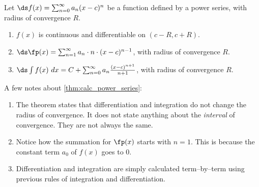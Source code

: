{Let $\ds f(x) = \sum_{n=0}^\infty a_n(x-c)^n$ be a function defined by a power series, with radius of convergence $R$.
\begin{enumerate}
	\item $f(x)$ is continuous and differentiable on $(c-R,c+R)$.
	\item	$\ds \fp(x) = \sum_{n=1}^\infty a_n\cdot n\cdot (x-c)^{n-1}$, with radius of convergence $R$.
	\item	$\ds \int f(x)\ dx = C+\sum_{n=0}^\infty a_n\frac{(x-c)^{n+1}}{n+1}$, with radius of convergence $R$.
\end{enumerate}}

A few notes about \autoref{thm:calc_power_series}:
\begin{enumerate}
	\item The theorem states that differentiation and integration do not change the radius of convergence. It does not state anything about the \emph{interval} of convergence. They are not always the same.
	\item	Notice how the summation for $\fp(x)$ starts with $n=1$. This is because the constant term $a_0$ of $f(x)$ goes to 0.
	\item	Differentiation and integration are simply calculated term--by--term using previous rules of integration and differentiation.
\end{enumerate}

